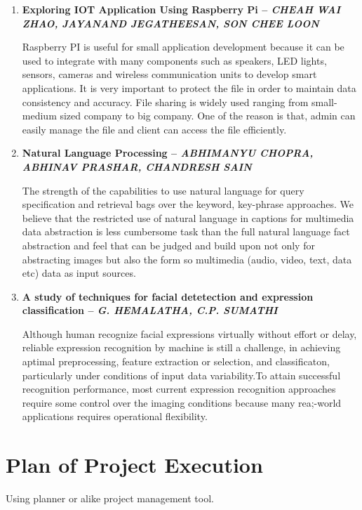 \documentclass[16pt,oneside,a4paper]{article}
\begin{document}
\begin{enumerate}
\pagebreak

\item \textbf{Exploring IOT Application Using Raspberry Pi -- \textit{CHEAH WAI ZHAO, JAYANAND JEGATHEESAN, SON CHEE LOON}}

Raspberry PI is useful for small application development because it can be used to integrate with many components such as speakers, LED lights, sensors, cameras and wireless communication units to develop smart applications. It is very important to protect the file in order to maintain data consistency and accuracy. File sharing is widely used ranging from small-medium sized company to big company. One of the reason is that, admin can easily manage the file and client can access the file efficiently.\\

\item \textbf{Natural Language Processing -- \textit{ABHIMANYU CHOPRA, ABHINAV PRASHAR, CHANDRESH SAIN}}

The strength of the capabilities to use natural language for query specification and retrieval bags over the keyword, key-phrase approaches. We believe that the restricted use of natural language in captions for multimedia data abstraction is less cumbersome task than the full natural language fact abstraction and feel that can be judged and build upon not only for abstracting images but also the form so multimedia (audio, video, text, data etc) data as input sources.\\

\item \textbf{A study of techniques for facial detetection and expression classification -- \textit{G. HEMALATHA, C.P. SUMATHI}}

Although human recognize facial expressions virtually without effort or delay, reliable expression recognition by machine is still a challenge, in achieving aptimal preprocessing, feature extraction or selection, and classificaton, particularly under conditions of input data variability.To attain successful recognition performance, most current expression recognition approaches require some control over the imaging conditions because many rea;-world applications requires operational flexibility.\\

\end{enumerate}

\section{Plan of Project Execution}
  Using planner or alike project management tool.
\end{document}

